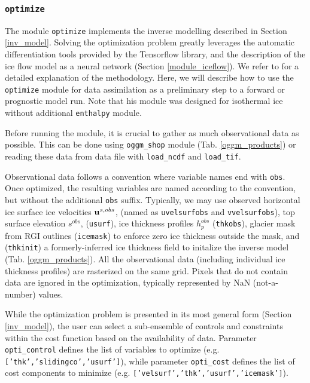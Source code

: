 \documentclass[10pt,twocolumn]{article}
\begin{document}
\subsubsection{\texttt{optimize}}
\label{module_optimize}

The module \texttt{optimize} implements the inverse modelling described in Section \ref{inv_model}.
Solving the optimization problem greatly leverages the automatic differentiation tools provided by the
Tensorflow library, and the description of the ice flow model as a neural network (Section \ref{module_iceflow}). 
We refer to \citet{jouvet2023inversion} for a detailed explanation of the methodology.
Here, we will describe how to use the \texttt{optimize} module for data assimilation as a preliminary step 
to a forward or prognostic model run.
Note that his module was designed for isothermal ice without additional \texttt{enthalpy} module.

Before running the module, it is crucial to gather as much observational data as possible. 
This can be done using \texttt{oggm\_shop} module (Tab. \ref{oggm_products}) or reading 
these data from data file with \texttt{load\_ncdf} and \texttt{load\_tif}. 

Observational data follows a convention where variable names end with \texttt{obs}.
Once optimized, the resulting variables are named according to the convention,
but without the additional \texttt{obs} suffix.
Typically, we may use observed horizontal ice surface ice velocities ${\bf u}^{s,obs}$,
(named as \texttt{uvelsurfobs} and \texttt{vvelsurfobs}), top surface elevation $s^{obs}$,
(\texttt{usurf}), ice thickness profiles $h_p^{obs}$ (\texttt{thkobs}), 
glacier mask from RGI outlines (\texttt{icemask}) to enforce zero ice thickness outside the mask,
and (\texttt{thkinit}) a formerly-inferred ice thickness field to initalize the inverse model 
(Tab. \ref{oggm_products}).
All the observational data (including individual ice thickness profiles) are rasterized on the same grid. 
Pixels that do not contain data are ignored in the optimization, 
typically represented by NaN (not-a-number) values.

While the optimization problem is presented in its most general form (Section \ref{inv_model}), 
the user can select a sub-ensemble of controls and 
constraints within the cost function based on the availability of data.
Parameter \texttt{opti\_control} defines the list of variables to optimize 
(e.g. \texttt{['thk','slidingco','usurf']}),
while parameter \texttt{opti\_cost} defines the list of cost components to minimize
(e.g. \texttt{['velsurf','thk','usurf','icemask']}). 
\end{document}
